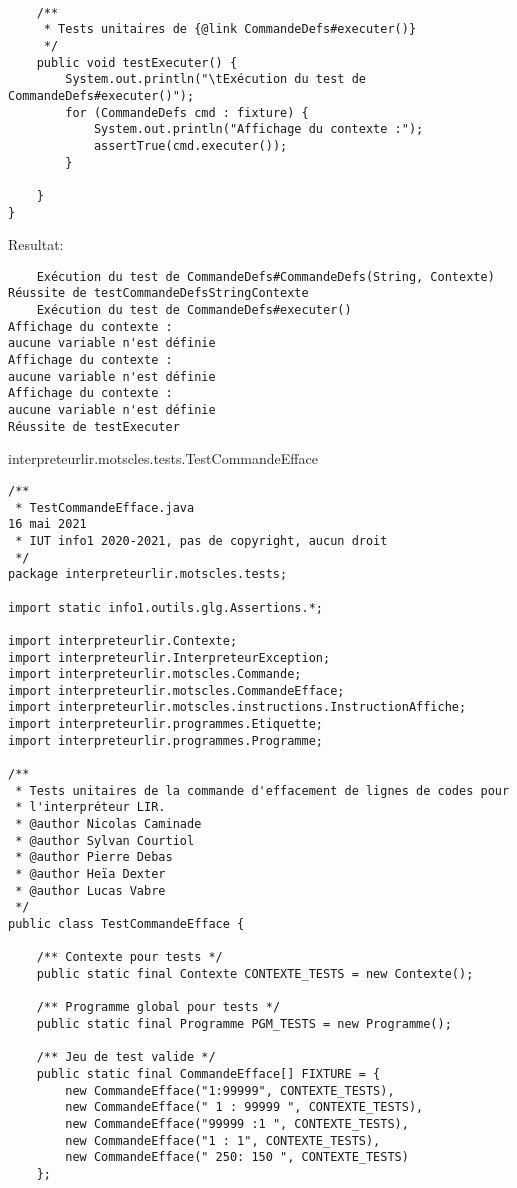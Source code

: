 \begin{enum}
\begin{verbatim}
    
    /**
     * Tests unitaires de {@link CommandeDefs#executer()}
     */
    public void testExecuter() {
        System.out.println("\tExécution du test de CommandeDefs#executer()");
        for (CommandeDefs cmd : fixture) {
            System.out.println("Affichage du contexte :");
            assertTrue(cmd.executer());
        }
        
    }
}
\end{verbatim}
Resultat:
\begin{verbatim}
    Exécution du test de CommandeDefs#CommandeDefs(String, Contexte)
Réussite de testCommandeDefsStringContexte
    Exécution du test de CommandeDefs#executer()
Affichage du contexte :
aucune variable n'est définie
Affichage du contexte :
aucune variable n'est définie
Affichage du contexte :
aucune variable n'est définie
Réussite de testExecuter
\end{verbatim}

    \item interpreteurlir.motscles.tests.TestCommandeEfface
\begin{verbatim}
/**
 * TestCommandeEfface.java                                           16 mai 2021
 * IUT info1 2020-2021, pas de copyright, aucun droit
 */
package interpreteurlir.motscles.tests;

import static info1.outils.glg.Assertions.*;

import interpreteurlir.Contexte;
import interpreteurlir.InterpreteurException;
import interpreteurlir.motscles.Commande;
import interpreteurlir.motscles.CommandeEfface;
import interpreteurlir.motscles.instructions.InstructionAffiche;
import interpreteurlir.programmes.Etiquette;
import interpreteurlir.programmes.Programme;

/**
 * Tests unitaires de la commande d'effacement de lignes de codes pour 
 * l'interpréteur LIR.
 * @author Nicolas Caminade
 * @author Sylvan Courtiol
 * @author Pierre Debas
 * @author Heïa Dexter
 * @author Lucas Vabre
 */
public class TestCommandeEfface {
    
    /** Contexte pour tests */
    public static final Contexte CONTEXTE_TESTS = new Contexte();
    
    /** Programme global pour tests */
    public static final Programme PGM_TESTS = new Programme();
    
    /** Jeu de test valide */
    public static final CommandeEfface[] FIXTURE = {
        new CommandeEfface("1:99999", CONTEXTE_TESTS),
        new CommandeEfface(" 1 : 99999 ", CONTEXTE_TESTS),
        new CommandeEfface("99999 :1 ", CONTEXTE_TESTS),
        new CommandeEfface("1 : 1", CONTEXTE_TESTS),
        new CommandeEfface(" 250: 150 ", CONTEXTE_TESTS)
    };
    

\end{verbatim}
\end{enum}
